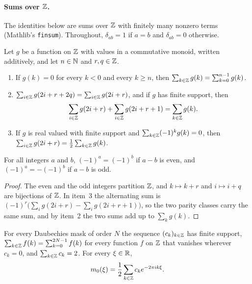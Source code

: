 \paragraph{Sums over $\mathbb{Z}$.}
The identities below are sums over $\mathbb{Z}$ with finitely many nonzero terms (Mathlib's
\texttt{finsum}). Throughout, $\delta_{ab} = 1$ if $a = b$ and $\delta_{ab} = 0$ otherwise.

\begin{lemma}
\label{lem:daub-parity-split}
\leanok
Let $g$ be a function on $\mathbb{Z}$ with values in a commutative monoid, written additively, and let
$n \in \mathbb{N}$ and $r, q \in \mathbb{Z}$.
\begin{enumerate}
  \item If $g(k) = 0$ for every $k < 0$ and every $k \geq n$, then
    $\sum_{k \in \mathbb{Z}} g(k) = \sum_{k=0}^{n-1} g(k)$.
  \item $\sum_{i \in \mathbb{Z}} g(2i + r + 2q) = \sum_{i \in \mathbb{Z}} g(2i + r)$, and if $g$ has finite
    support, then
    \[
      \sum_{i \in \mathbb{Z}} g(2i + r) + \sum_{i \in \mathbb{Z}} g(2i + r + 1) = \sum_{k \in \mathbb{Z}} g(k) .
    \]
  \item If $g$ is real valued with finite support and $\sum_{k \in \mathbb{Z}} (-1)^k g(k) = 0$, then
    $\sum_{i \in \mathbb{Z}} g(2i + r) = \frac12 \sum_{k \in \mathbb{Z}} g(k)$.
\end{enumerate}
For all integers $a$ and $b$, $(-1)^a = (-1)^b$ if $a - b$ is even, and $(-1)^a = -(-1)^b$ if
$a - b$ is odd.
\end{lemma}

\begin{proof}
\leanok
The even and the odd integers partition $\mathbb{Z}$, and $k \mapsto k + r$ and $i \mapsto i + q$ are
bijections of $\mathbb{Z}$. In item~3 the alternating sum is
$(-1)^r \bigl(\sum_i g(2i + r) - \sum_i g(2i + r + 1)\bigr)$, so the two parity classes carry the
same sum, and by item~2 the two sums add up to $\sum_k g(k)$.
\end{proof}

\begin{lemma}
\label{lem:daub-coeff-finsum}
\leanok
{}
For every Daubechies mask of order $N$ the sequence $(c_k)_{k \in \mathbb{Z}}$ has finite support,
$\sum_{k \in \mathbb{Z}} f(k) = \sum_{k=0}^{2N-1} f(k)$ for every function $f$ on $\mathbb{Z}$ that vanishes
wherever $c_k = 0$, and $\sum_{k \in \mathbb{Z}} c_k = 2$. For every $\xi \in \mathbb{R}$,
\[
  m_0(\xi) = \frac12 \sum_{k \in \mathbb{Z}} c_k e^{-2\pi i k \xi} .
\]
\end{lemma}

